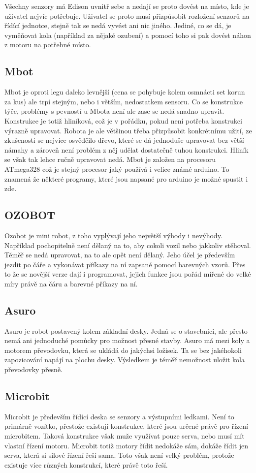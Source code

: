 \documentclass{template/socthesis}
\begin{document}
Všechny senzory má Edison uvnitř sebe a nedají se proto dovést na místo, kde je uživatel nejvíc potřebuje. Uživatel se proto musí přizpůsobit rozložení senzorů na řídící jednotce, stejně tak se nedá vyvést ani nic jiného. Jediné, co se dá, je vyměňovat kola (například za nějaké ozubení) a pomocí toho si pak dovést náhon z motoru na potřebné místo.


\subsection{Mbot}
Mbot je oproti legu daleko levnější (cena se pohybuje kolem osmnácti set korun za kus) ale trpí stejným, nebo i větším, nedostatkem sensoru. Co se konstrukce týče, problémy s pevností u Mbota není ale zase se nedá snadno upravit. Konstrukce je totiž hliníková, což je v pořádku, pokud není potřeba konstrukci výrazně upravovat. Robota je ale většinou třeba přizpůsobit konkrétnímu užití, ze zkušenosti se nejvíce osvědčilo dřevo, které se dá jednoduše upravovat bez větší námahy a zároveň není problém z něj udělat dostatečně tuhou konstrukci. Hliník se však tak lehce ručně upravovat nedá. Mbot je založen na procesoru ATmega328 což je stejný procesor jaký používá i velice známé arduino. To znamená že některé programy, které jsou napsané pro arduino je možné spustit i zde.

\subsection{OZOBOT}
Ozobot je mini robot, z toho vyplývají jeho největší výhody i nevýhody. Například pochopitelně není dělaný na to, aby cokoli vozil nebo jakkoliv stěhoval. Téměř se nedá upravovat, na to ale opět není dělaný. Jeho účel je především jezdit po čáře a vykonávat příkazy na ní zapsané pomocí barevných vzorů. Přes to že se novější verze dají i programovat, jejich funkce jsou pořád mířené do velké míry právě na čáru a barevné příkazy na ní.

\subsection{Asuro}
Asuro je robot postavený kolem základní desky. Jedná se o stavebnici, ale přesto nemá ani jednoduché pomůcky pro možnost přesné stavby. Asuro má mezi koly a motorem převodovku, která se ukládá do jakýchsi ložisek. Ta se bez jakéhokoli zapozicování napájí na plochu desky. Výsledkem je téměř nemožnost uložit kola převodovky přesně.


\subsection{Microbit}
Microbit je především řídící deska se senzory a výstupními ledkami. Není to primárně vozítko, přestože existují konstrukce, které jsou určené právě pro řízení microbitem. Taková konstrukce však muže využívat pouze serva, nebo musí mít vlastní řízení motoru. Microbit totiž motory řídit nedokáže sám, dokáže řídit jen serva, která si silové řízení řeší sama. Toto však není velký problém, protože existuje více různých konstrukcí, které právě toto řeší. 
\end{document}
